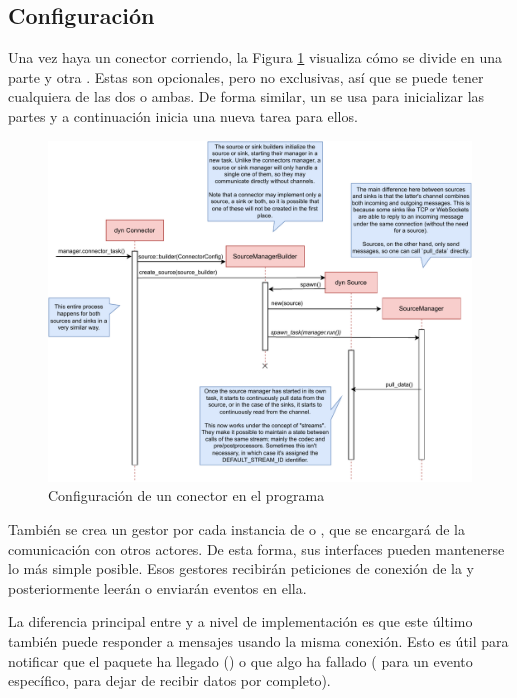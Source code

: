 \subsection{Configuración}

Una vez haya un conector corriendo, la Figura \ref{fig:tremor_setting_up}
visualiza cómo se divide en una parte \sink y otra \source. Estas son
opcionales, pero no exclusivas, así que se puede tener cualquiera de las dos o
ambas. De forma similar, un \builder se usa para inicializar las partes y a
continuación inicia una nueva tarea para ellos.

\begin{figure}
    \centering
    \includegraphics[width=\textwidth]{./Imagenes/setting-up.pdf}
    \caption{Configuración de un conector en el programa}%
    \label{fig:tremor_setting_up}
\end{figure}

También se crea un gestor por cada instancia de \sink o \source, que se
encargará de la comunicación con otros actores. De esta forma, sus interfaces
pueden mantenerse lo más simple posible. Esos gestores recibirán peticiones de
conexión de la \pipeline y posteriormente leerán o enviarán eventos en ella.

La diferencia principal entre \sources y \sinks a nivel de implementación es que
este último también puede responder a mensajes usando la misma conexión. Esto es
útil para notificar que el paquete ha llegado () o que algo ha fallado
( para un evento específico,  para dejar de
recibir datos por completo).

